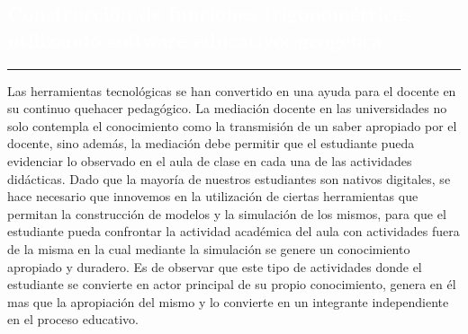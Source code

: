\begin{titlepage}
\pagecolor{white}
\newcommand{\R}{\ensuremath{\mathbb{R}}}
\BgThispage
{}
\vspace*{-1.1cm}
\noindent
\def\titulo#1{\section{#1}}

\section{\bf\large\textcolor{white}{Construcci\'on de funciones trigonom\'etricas utilizando software educativo: geogebra}}
\vspace*{2cm}\par
\noindent

\begin{minipage}{0.5\linewidth}
\begin{minipage}{0.45\linewidth}
    \begin{flushright}
        \printauthor
    \end{flushright}
\end{minipage} \hspace{-3pt}
%
\begin{minipage}{0.02\linewidth}
   \color{ptctitle} \rule{1pt}{225pt}
\end{minipage} 
\end{minipage}
\hspace*{-4.5cm}
\begin{minipage}{0.85\linewidth}
\begin{minipage}{0.85\linewidth}
\footnotesize
\vspace{5pt}
    \begin{resumen}
    
Las herramientas tecnol\'ogicas se han convertido en una ayuda para el
docente en su continuo quehacer pedag\'ogico.  La mediaci\'on docente en
las universidades no solo contempla el conocimiento como la
transmisi\'on de un saber apropiado por el docente, sino adem\'as, la
mediaci\'on debe permitir que el estudiante pueda evidenciar lo
observado en el aula de clase en cada una de las actividades
did\'acticas. Dado que la mayor\'ia de nuestros estudiantes son nativos
digitales, se hace necesario que innovemos en la utilizaci\'on de
ciertas herramientas que permitan la construcci\'on de modelos y la
simulaci\'on de los mismos, para que el estudiante pueda confrontar la
actividad acad\'emica del aula con actividades fuera de la misma en la
cual mediante la simulaci\'on se genere un conocimiento apropiado y
duradero.  Es de observar que este tipo de actividades donde el
estudiante se convierte en actor principal de su propio
conocimiento, genera en \'el mas que la apropiaci\'on del mismo y lo
convierte en un integrante independiente en el proceso educativo.\\


\end{resumen}
\end{minipage}
\end{minipage}
\end{titlepage}
